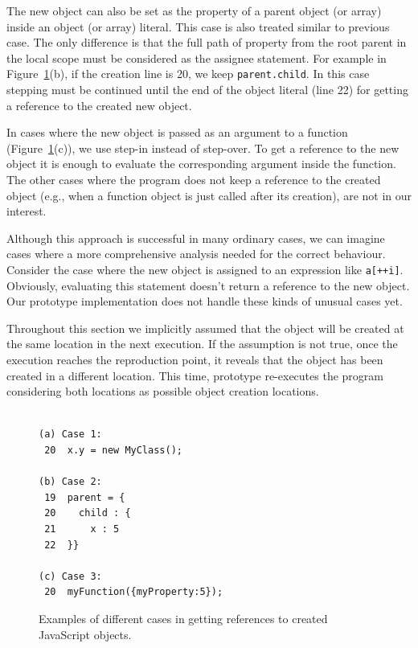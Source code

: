 \documentclass{sig-alternate}
\begin{document}
The new object can also be set as the property of a parent object 
(or array) inside an object (or array) literal. This case is also treated 
similar to previous case. The only difference is that the full path of property 
from the root parent in the local scope must be considered as the assignee statement. For
example in Figure~\ref{fig:objectCreation}(b), if the creation line
is 20, we keep \texttt{parent.child}. In this case stepping
must be continued until the end of the object literal (line 22) for getting a reference
to the created new object.

In cases where the new object is passed as an 
argument to a function (Figure~\ref{fig:objectCreation}(c)), we use step-in instead of step-over. 
To get a reference to the new object
it is enough to evaluate the corresponding argument inside the function. The other cases
where the program does not keep a reference to the created object (e.g., when a function object is
just called after its creation), are not in our interest. 


Although this approach is successful in many ordinary cases, we can imagine 
cases where a more comprehensive analysis needed for the correct behaviour. 
Consider the case where the new object is assigned to an expression like \texttt{a[++i]}. 
Obviously, evaluating this statement doesn't return
a reference to the new object. Our prototype implementation does not handle these kinds of unusual cases yet.

Throughout this section we implicitly assumed that the object will be created at 
the same location in the next execution. If the assumption is
not true, once the execution reaches the reproduction point, it
reveals that the object has been created in a different location. This time,
prototype re-executes the program considering both locations as possible 
object creation locations.

\begin{figure}[htp]
\lstset{basicstyle=\scriptsize}
\begin{lstlisting}[frame=single, language=myLang]% framerule=0pt]

(a) Case 1:
 20  x.y = new MyClass();

(b) Case 2:
 19  parent = {
 20    child : {
 21      x : 5
 22  }}

(c) Case 3:
 20  myFunction({myProperty:5});

\end{lstlisting} 


\caption{Examples of different cases in getting references to created JavaScript objects.}
\label{fig:objectCreation}
\end{figure}
\end{document}
